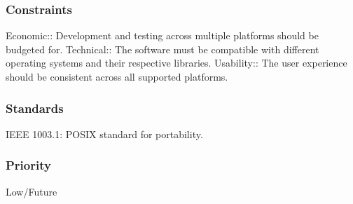 \subsubsection{Constraints}
Economic:: Development and testing across multiple platforms should be budgeted for.
Technical:: The software must be compatible with different operating systems and their respective libraries.
Usability:: The user experience should be consistent across all supported platforms.
\subsubsection{Standards}
IEEE 1003.1: POSIX standard for portability.
\subsubsection{Priority}
Low/Future
